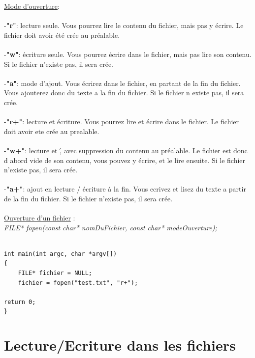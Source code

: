 \documentclass[a4paper,12pt,openany]{book}
\begin{document}
\underline{Mode d'ouverture}:\\
\\
-\textbf{"r"}: lecture seule. Vous pourrez lire le contenu du fichier, mais pas y \'ecrire. Le fichier doit avoir \'et\'e cr\'ee au pr\'ealable.\\
\\
-\textbf{"w"}: \'ecriture seule. Vous pourrez \'ecrire dans le fichier, mais pas lire son contenu. Si le fichier n'existe pas, il sera cr\'ee.\\
\\
-\textbf{"a"}: mode d'ajout. Vous \'ecrirez dans le fichier, en partant de la fin du fichier. Vous ajouterez donc du texte a la fin du fichier. Si le fichier n existe pas, il sera cr\'ee.\\
\\
-\textbf{"r+"}: lecture et \'ecriture. Vous pourrez lire et \'ecrire dans le fichier. Le fichier doit avoir ete cr\'ee au prealable.\\
\\
-\textbf{"w+"}: lecture et \', avec suppression du contenu au pr\'ealable. Le fichier est donc d abord vide de son contenu, vous pouvez y \'ecrire, et le lire ensuite. Si le fichier n'existe pas, il sera cr\'ee.\\
\\
-\textbf{"a+"}: ajout en lecture / \'ecriture \`a la fin. Vous ecrivez et lisez du texte a partir de la fin du fichier. Si le fichier n'existe pas, il sera cr\'ee.\\
\\
\underline{Ouverture d'un fichier} :\\
\emph{FILE* fopen(const char* nomDuFichier, const char* modeOuverture);}\\
\\
\begin{verbatim}
int main(int argc, char *argv[])
{
	FILE* fichier = NULL;
	fichier = fopen("test.txt", "r+");

return 0;
}
\end{verbatim}





\section{Lecture/Ecriture dans les fichiers}
\end{document}
